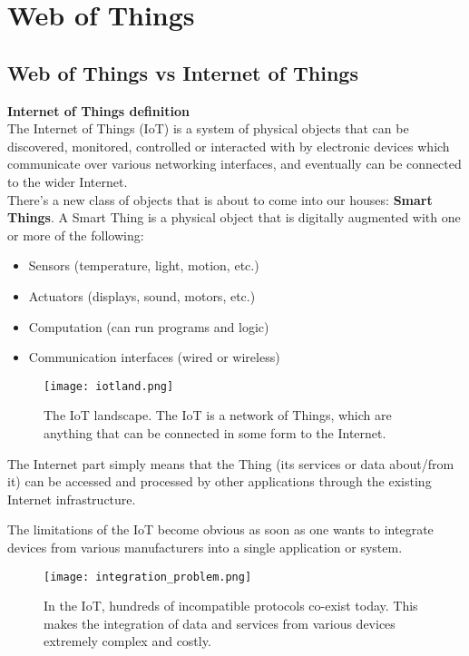 \chapter{Web of Things}
\label{web-of-things}

\section{Web of Things vs Internet of Things}

\textbf{Internet of Things definition} \\

The Internet of Things (IoT) is a system of physical objects that can be
discovered, monitored, controlled or interacted with by electronic devices
which communicate over various networking interfaces, and eventually can be
connected to the wider Internet. \\

There's a new class of objects that is about to come into our houses:
\textbf{Smart Things}. A Smart Thing is a physical object that is digitally
augmented with one or more of the following:

\begin{itemize}
    \item Sensors (temperature, light, motion, etc.)
    \item Actuators (displays, sound, motors, etc.)
    \item Computation (can run programs and logic)
    \item Communication interfaces (wired or wireless)
\end{itemize}

\begin{figure}[H]
  \centering
  \texttt{[image: iotland.png]}
  \caption{The IoT landscape. The IoT is a network of Things, which are
anything that can be connected in some form to the Internet.}
  \label{fig:iotland}
\end{figure}

The Internet part simply means that the Thing (its services or data about/from
it) can be accessed and processed by other applications through the existing
Internet infrastructure.

The limitations of the IoT become obvious as soon as one wants to integrate
devices from various manufacturers into a single application or system.

\begin{figure}[H]
  \centering
  \texttt{[image: integration\_problem.png]}
  \caption{In the IoT, hundreds of incompatible protocols co-exist today.
This makes the integration of data and services from various devices extremely
complex and costly.}
  \label{fig:integration_problem}
\end{figure}

